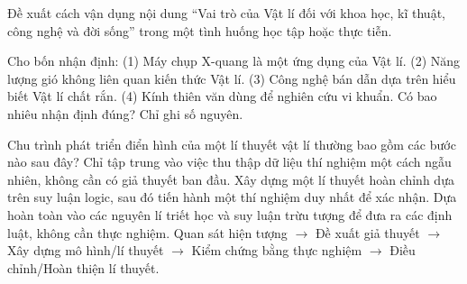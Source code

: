 \begin{bt}
Đề xuất cách vận dụng nội dung “Vai trò của Vật lí đối với khoa học, kĩ thuật, công nghệ và đời sống” trong một tình huống học tập hoặc thực tiễn.
\end{bt}

\begin{ex}
Cho bốn nhận định: (1) Máy chụp X-quang là một ứng dụng của Vật lí. (2) Năng lượng gió không liên quan kiến thức Vật lí. (3) Công nghệ bán dẫn dựa trên hiểu biết Vật lí chất rắn. (4) Kính thiên văn dùng để nghiên cứu vi khuẩn. Có bao nhiêu nhận định đúng? Chỉ ghi số nguyên.
\end{ex}

\begin{ex}
Chu trình phát triển điển hình của một lí thuyết vật lí thường bao gồm các bước nào sau đây?
\choice
{Chỉ tập trung vào việc thu thập dữ liệu thí nghiệm một cách ngẫu nhiên, không cần có giả thuyết ban đầu.}
{Xây dựng một lí thuyết hoàn chỉnh dựa trên suy luận logic, sau đó tiến hành một thí nghiệm duy nhất để xác nhận.}
{Dựa hoàn toàn vào các nguyên lí triết học và suy luận trừu tượng để đưa ra các định luật, không cần thực nghiệm.}
{\True Quan sát hiện tượng $\rightarrow$ Đề xuất giả thuyết $\rightarrow$ Xây dựng mô hình/lí thuyết $\rightarrow$ Kiểm chứng bằng thực nghiệm $\rightarrow$ Điều chỉnh/Hoàn thiện lí thuyết.}
\end{ex}

